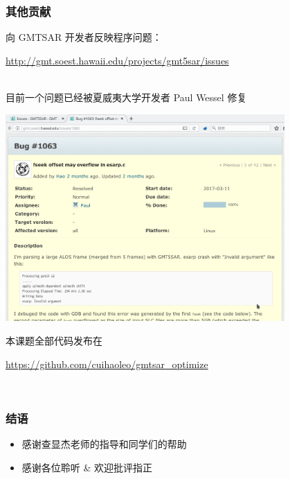\documentclass{beamer}
\begin{document}
\begin{frame}
    \frametitle{其他贡献}

    向 GMTSAR 开发者反映程序问题：
    \begin{scriptsize} \url{http://gmt.soest.hawaii.edu/projects/gmt5sar/issues} \end{scriptsize}\\
    目前一个问题已经被夏威夷大学开发者 Paul Wessel 修复

    \begin{center}
        \includegraphics[width=0.80\textwidth,trim={0cm 5cm 0 2cm},clip]{figures/issue.png}
    \end{center}
    本课题全部代码发布在\\
    \begin{scriptsize} \url{https://github.com/cuihaoleo/gmtsar_optimize} \end{scriptsize}\\
\end{frame}


\begin{frame}
    \frametitle{结语}

    \begin{itemize}
        \item 感谢查显杰老师的指导和同学们的帮助
        \item 感谢各位聆听 \& 欢迎批评指正
    \end{itemize}
\end{frame}
\end{document}
